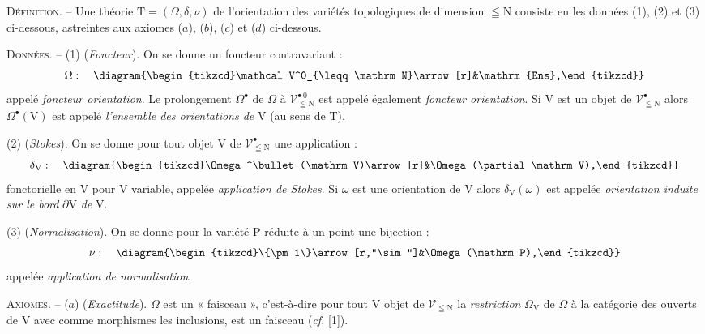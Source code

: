 \textsc{Définition}. -- Une théorie $\mathrm T=(\Omega,\delta,\nu)$ de l'orientation des variétés topologiques de dimension $\leqq\mathrm N$ consiste en les données (1), (2) et (3) ci-dessous, astreintes aux axiomes ($a$), ($b$), ($c$) et ($d$) ci-dessous.

\textsc{Données}. -- (1) (\textit{Foncteur}). On se donne un foncteur contravariant :
\[
\Omega:\quad\diagram{\begin{tikzcd}\mathcal V^0_{\leqq\mathrm N}\arrow[r]&\mathrm{Ens},\end{tikzcd}}
\]
appelé \textit{foncteur orientation}. Le prolongement $\Omega^\bullet$ de $\Omega$ à $\mathcal V^{\bullet\,0}_{\leqq\mathrm N}$ est appelé également \textit{foncteur orientation}. Si $\mathrm V$ est un objet de $\mathcal V^\bullet_{\leqq\mathrm N}$ alors $\Omega^\bullet(\mathrm V)$ est appelé \textit{l'ensemble des orientations de} $\mathrm V$ (au sens de $\mathrm T$).

(2) (\textit{Stokes}). On se donne pour tout objet $\mathrm V$ de $\mathcal V^\bullet_{\leqq\mathrm N}$ une application :
\[
\delta_{\mathrm V}:\quad\diagram{\begin{tikzcd}\Omega^\bullet(\mathrm V)\arrow[r]&\Omega(\partial\mathrm V),\end{tikzcd}}
\]
fonctorielle en $\mathrm V$ pour $\mathrm V$ variable, appelée \textit{application de Stokes}. Si $\omega$ est une orientation de $\mathrm V$ alors $\delta_{\mathrm V}(\omega)$ est appelée \textit{orientation induite sur le bord} $\partial\mathrm V$ \textit{de} $\mathrm V$.

(3) (\textit{Normalisation}). On se donne pour la variété $\mathrm P$ réduite à un point une bijection :
\[
\nu:\quad\diagram{\begin{tikzcd}\{\pm1\}\arrow[r,"\sim"]&\Omega(\mathrm P),\end{tikzcd}}
\]
appelée \textit{application de normalisation}.

\textsc{Axiomes}. -- ($a$) (\textit{Exactitude}). $\Omega$ est un « faisceau », c'est-à-dire pour tout $\mathrm V$ objet de $\mathcal V_{\leqq\mathrm N}$ la \textit{restriction} $\Omega_{\mathrm V}$ de $\Omega$ à la catégorie des ouverts de $\mathrm V$ avec comme morphismes les inclusions, est un faisceau (\textit{cf.} [1]).

